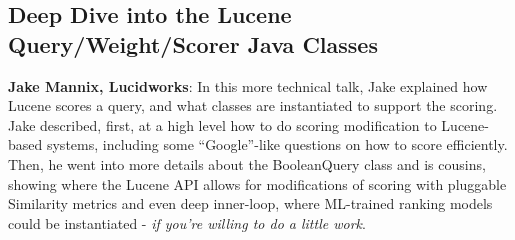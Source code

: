 \subsection*{ Deep Dive into the Lucene Query/Weight/Scorer Java Classes}
{\bf Jake Mannix, Lucidworks}:
In this more technical talk, Jake explained how Lucene scores a query, and what classes are instantiated to support the scoring. Jake described, first, at a high level how to do scoring modification to Lucene-based systems, including some ``Google''-like questions on how to score efficiently. Then, he went into more details about the BooleanQuery class and is cousins, showing where the Lucene API allows for modifications of scoring with pluggable Similarity metrics and even deep inner-loop, where ML-trained ranking models could be instantiated - \emph{if you're willing to do a little work}.
